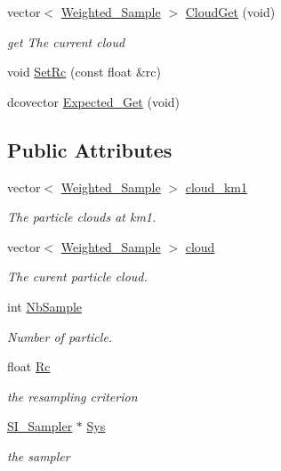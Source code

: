 \begin{CompactItemize}
vector$<$ \hyperlink{class_weighted___sample}{Weighted\_\-Sample} $>$ \hyperlink{class_s_i_s_r___filter_9ee7212b795b51f2c13e06d84bebe9cb}{CloudGet} (void)
\begin{CompactList}\small\item\em get The current cloud \item\end{CompactList}\item 
void \hyperlink{class_s_i_s_r___filter_08cb01476a0433a7414fe4e4be82d572}{SetRc} (const float \&rc)
\item 
dcovector \hyperlink{class_s_i_s_r___filter_2d1eb0ceb62531ed48af9a424bc62210}{Expected\_\-Get} (void)
\end{CompactItemize}
\subsection*{Public Attributes}
\begin{CompactItemize}
\item 
vector$<$ \hyperlink{class_weighted___sample}{Weighted\_\-Sample} $>$ \hyperlink{class_s_i_s_r___filter_abf9ea165b2caafbe8b0ed1f4182419e}{cloud\_\-km1}
\begin{CompactList}\small\item\em The particle clouds at km1. \item\end{CompactList}\item 
vector$<$ \hyperlink{class_weighted___sample}{Weighted\_\-Sample} $>$ \hyperlink{class_s_i_s_r___filter_7ac75002d39baceda7ef98f1551243bd}{cloud}
\begin{CompactList}\small\item\em The curent particle cloud. \item\end{CompactList}\item 
int \hyperlink{class_s_i_s_r___filter_6fc6faef959558a07d6a6a6ead140eac}{NbSample}
\begin{CompactList}\small\item\em Number of particle. \item\end{CompactList}\item 
float \hyperlink{class_s_i_s_r___filter_ef137d325c5bc000e33fe4d7c4d53347}{Rc}
\begin{CompactList}\small\item\em the resampling criterion \item\end{CompactList}\item 
\hyperlink{class_s_i___sampler}{SI\_\-Sampler} $\ast$ \hyperlink{class_s_i_s_r___filter_2dec4b493576d6bbb1b59c267e910d1a}{Sys}
\begin{CompactList}\small\item\em the sampler \item\end{CompactList}\end{CompactItemize}
